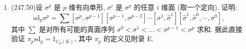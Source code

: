 \begin{enumerate}
\begin{proofc}[解答]
        同理$f_{\star 1}([z_2]) = [z_1]$,
        因此$f$为满足条件的单纯映射;

        我们任取$r \in \mathrm{Aut}(S^1)$ (比如将$S^1$的顶点三轮换旋转),然后取
        $$f : (x, y) \mapsto (y, r(x)),$$
        则$f$是另一个满足条件的单纯映射.


    (2)
    我们给出$g:K^0 \to K^0, (x,y) \mapsto (x,0)$,
    $h:K^0 \to K^0, (x,y) \mapsto ((y-x)(\mod 3),0)$
    然后将其延拓到整个$K$,容易验证$g,h$均为符合条件的单纯映射.
        
        

    \end{proofc}

    
    \item(247.50)设 $\sigma^p$ 是 $p$ 维有向单形, $\sigma^i$ 是 $\sigma^p$ 的任意 $i$ 维面 (取一个定向). 证明:
    \[
        \text{sd}_p \sigma^p = \sum [\sigma^p, \sigma^{p-1}][\sigma^{p-1}, \sigma^{p-2}] \cdots [\sigma^1, \hat{\sigma}^1][\hat{\sigma}^1, \hat{\sigma}^0, \cdots, \sigma^0],
    \]
    其中 $\sum$ 是对所有可能的真面序列 $\sigma^0 < \sigma^1 < \dots < \sigma^{p-1} < \sigma^p$ 求和. 据此直接验证 $\pi_p \text{sd}_p = 1_{C_p(K)}$, 其中 $\pi_p$ 的定义见附录 E.
\end{enumerate}


